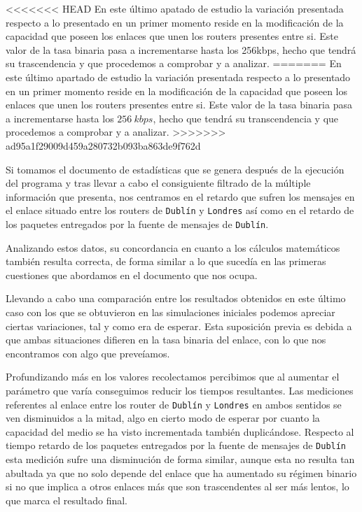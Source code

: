 \documentclass{article}[10pt]
\begin{document}
<<<<<<< HEAD
		En este último apatado de estudio la variación presentada respecto a lo presentado en un primer momento reside en la modificación de la capacidad que poseen los enlaces que unen los routers presentes entre si. Este valor de la tasa binaria pasa a incrementarse hasta los 256kbps, hecho que tendrá su trascendencia y que procedemos a comprobar y a analizar.
=======
		En este último apartado de estudio la variación presentada respecto a lo presentado en un primer momento reside en la modificación de la capacidad que poseen los enlaces que unen los routers presentes entre si. Este valor de la tasa binaria pasa a incrementarse hasta los $256\ kbps$, hecho que tendrá su transcendencia y que procedemos a comprobar y a analizar.
>>>>>>> ad95a1f29009d459a280732b093ba863de9f762d

		Si tomamos el documento de estadísticas que se genera después de la ejecución del programa y tras llevar a cabo el consiguiente filtrado de la múltiple información que presenta, nos centramos en el retardo que sufren los mensajes en el enlace situado entre los routers de \texttt{Dublín} y \texttt{Londres} así como en el retardo de los paquetes entregados por la fuente de mensajes de \texttt{Dublín}.

		Analizando estos datos, su concordancia en cuanto a los cálculos matemáticos también resulta correcta, de forma similar a lo que sucedía en las primeras cuestiones que abordamos en el documento que nos ocupa.

		Llevando a cabo una comparación entre los resultados obtenidos en este último caso con los que se obtuvieron en las simulaciones iniciales podemos apreciar ciertas variaciones, tal y como era de esperar. Esta suposición previa es debida a que ambas situaciones difieren en la tasa binaria del enlace, con lo que nos encontramos con algo que preveíamos.

		Profundizando más en los valores recolectamos percibimos que al aumentar el parámetro que varía conseguimos reducir los tiempos resultantes. Las mediciones referentes al enlace entre los router de \texttt{Dublín} y \texttt{Londres} en ambos sentidos se ven disminuidos a la mitad, algo en cierto modo de esperar por cuanto la capacidad del medio se ha visto incrementada también duplicándose. Respecto al tiempo retardo de los paquetes entregados por la fuente de mensajes de \texttt{Dublín} esta medición sufre una disminución de forma similar, aunque esta no resulta tan abultada ya que no solo depende del enlace que ha aumentado su régimen binario si no que implica a otros enlaces más que son trascendentes al ser más lentos, lo que marca el resultado final.
\end{document}
